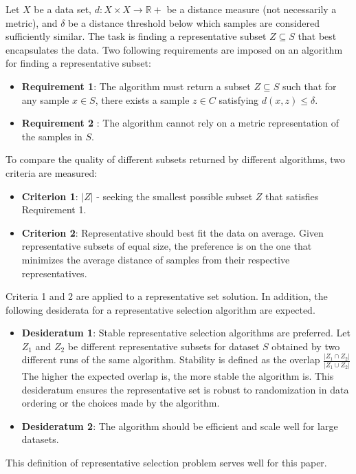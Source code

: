 \documentclass[thesis=B,english]{FITthesis}[2012/10/20]
\begin{document}
Let $X$ be a data set, $d \colon X \times X \to \mathbb{R} +$ be a distance measure (not necessarily a metric), and $\delta$ be a distance threshold below which samples are considered sufficiently similar.
The task is finding a representative subset $Z \subseteq S$ that best encapsulates the data.
Two following requirements are imposed on an algorithm for finding a representative subset:
\begin{itemize}
    \item \textbf{Requirement 1}: The algorithm must return a subset $Z \subseteq S$ such that for any sample $x \in S$, there exists a sample $z \in C$ satisfying $d(x, z) \le \delta$.
    \item \textbf{Requirement 2} : The algorithm cannot rely on a metric representation of the samples in $S$.
\end{itemize}
To compare the quality of different subsets returned by different algorithms, two criteria are measured:
\begin{itemize}
    \item \textbf{Criterion 1}: $|Z|$ - seeking the smallest possible subset $Z$ that satisfies Requirement 1.
    \item \textbf{Criterion 2}: Representative should best fit the data on average. Given representative subsets of equal size, the preference is on the one that minimizes the average distance of samples from their respective representatives.
\end{itemize}
Criteria 1 and 2 are applied to a representative set solution.
In addition, the following desiderata for a representative selection algorithm are expected.
\begin{itemize}
    \item \textbf{Desideratum 1}: Stable representative selection algorithms are preferred. Let $Z_1$ and $Z_2$ be different representative subsets for dataset $S$ obtained by two different runs of the same algorithm.
Stability is defined as the overlap $\frac{|Z_1 \cap Z_2|}{|Z_1 \cup Z_2|}$      The higher the expected overlap is, the more stable the algorithm is.
This desideratum ensures the representative set is robust to randomization in data ordering or the choices made by the algorithm.
    \item \textbf{Desideratum 2}: The algorithm should be efficient and scale
well for large datasets.
\end{itemize}

This definition of representative selection problem serves well for this paper.
\end{document}
